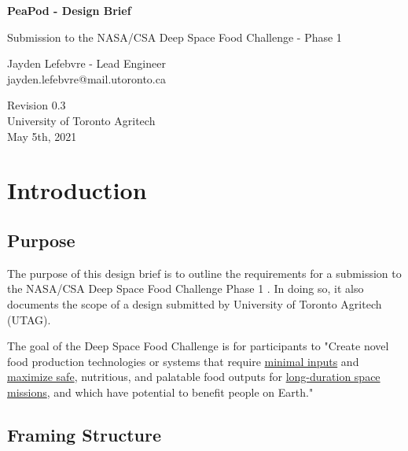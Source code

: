 \documentclass{report}
\begin{document}
\begin{titlepage}
    \begin{center}
        \vspace*{1.2cm}
        
        \textbf{\large{PeaPod - Design Brief}}
        
        \vspace{0.5cm}
        Submission to the NASA/CSA Deep Space Food Challenge - Phase 1

        \vfill
        
        Jayden Lefebvre - Lead Engineer\\\small{jayden.lefebvre@mail.utoronto.ca}
        
        \vspace{2.5cm}
        
        Revision 0.3\\
        University of Toronto Agritech\\
        May 5th, 2021
        
    \end{center}
 \end{titlepage}

\thispagestyle{plain}

\tableofcontents
\newpage

\section{Introduction}
\label{sec:intro}

\subsection{Purpose}
\label{sec:purpose}

The purpose of this design brief is to outline the requirements for a submission 
to the NASA/CSA Deep Space Food Challenge Phase 1 \cite{dsfc}. In doing so, it also
documents the scope of a design submitted by University of Toronto Agritech (UTAG).

The goal of the Deep Space Food Challenge is for participants to "Create novel 
food production technologies or systems that require \uline{minimal inputs} and \uline{maximize safe}, nutritious, and palatable food outputs for 
\uline{long-duration space missions}, and which have potential to benefit 
people on Earth." \cite{applicantguide}

\subsection{Framing Structure}
\label{sec:structure}
\end{document}
